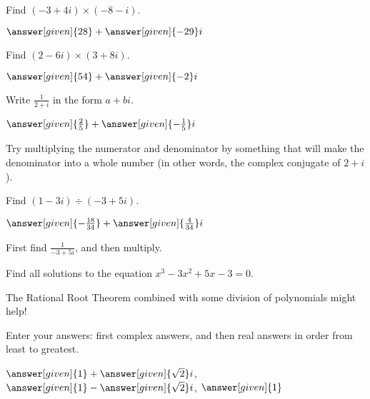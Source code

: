 \documentclass[nooutcomes]{ximera}
\begin{document}
\begin{problem}
Find $(-3 + 4i) \times (-8 - i)$.
\begin{prompt}
	$\answer[given]{28} + \answer[given]{-29}i$
\end{prompt}
\end{problem}




\begin{problem}
Find $(2-6i) \times (3+8i)$.
\begin{prompt}
	$\answer[given]{54} + \answer[given]{-2}i$
\end{prompt}
\end{problem}




\begin{problem}
Write $\frac{1}{2+i}$ in the form $a + bi$.
\begin{prompt}
	$\answer[given]{\frac{2}{5}} + \answer[given]{-\frac{1}{5}}i$
\end{prompt}
\begin{hint}
Try multiplying the numerator and denominator by something that will make the denominator into a whole number (in other words, the complex conjugate of $2+i$).
\end{hint}

\end{problem}



\begin{problem}
Find $(1-3i) \div (-3+5i)$.
\begin{prompt}
	$\answer[given]{-\frac{18}{34}} + \answer[given]{\frac{4}{34}}i$
\end{prompt}
\begin{hint}
First find $\frac{1}{-3+5i}$, and then multiply.
\end{hint}
\end{problem}



\begin{problem}
Find all solutions to the equation $x^3-3x^2+5x-3=0$. 
\begin{hint} 
The Rational Root Theorem combined with some division of polynomials might help!
\end{hint}
Enter your answers: first complex answers, and then real answers in order from least to greatest.

\begin{prompt}
$\answer[given]{1} + \answer[given]{\sqrt{2}}i$, $\answer[given]{1} - \answer[given]{\sqrt{2}}i$, $\answer[given]{1}$
\end{prompt}
\end{problem}
\end{document}
